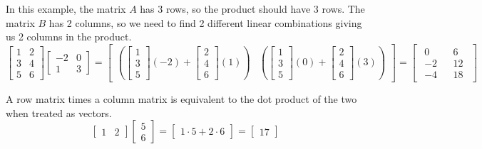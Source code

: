 \begin{example} 
In this example, the matrix $A$ has 3 rows, so the product should have 3 rows.  The matrix $B$ has 2 columns, so we need to find 2 different linear combinations giving us 2 columns in the product. 
$$ 
\begin{bmatrix}1 &2\\3&4\\5&6\end{bmatrix}
\begin{bmatrix}-2&0\\1&3\end{bmatrix} =
\begin{bmatrix}
\left(\begin{bmatrix}1\\3\\5\end{bmatrix}(-2)+\begin{bmatrix}2\\4\\6\end{bmatrix}(1)\right)
&
\left(\begin{bmatrix}1\\3\\5\end{bmatrix}(0)+\begin{bmatrix}2\\4\\6\end{bmatrix}(3)\right)
\end{bmatrix}
=
\begin{bmatrix}
\begin{matrix}0\\-2\\-4\end{matrix}&
\begin{matrix}6\\12\\18\end{matrix}
\end{bmatrix}$$
\end{example}



\begin{example} A row matrix times a column matrix is equivalent to the dot product of the two when treated as vectors.
$$ 
\begin{bmatrix}1 & 2\end{bmatrix}\begin{bmatrix}5\\6\end{bmatrix} =
\begin{bmatrix}1\cdot 5 + 2\cdot 6\end{bmatrix} = \begin{bmatrix}17\end{bmatrix}
$$
\end{example}



